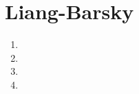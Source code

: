 \section*{Liang-Barsky}

	\begin{enumerate}\addtocounter{enumi}{27}
	
		\item 
		
		\item 
		
		\item 
		
		\item 
		
	\end{enumerate}
